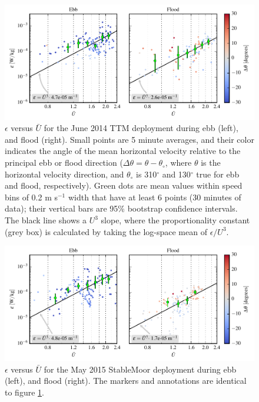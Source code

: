 \documentclass[twocol]{ametsoc}
\begin{document}
\begin{figure}[t]
  \centering
  \includegraphics{EpsVU_TTM_02}
  \caption{$\epsilon$ versus $\bar{U}$ for the June 2014 TTM deployment during ebb (left), and flood (right). Small points are 5 minute averages, and their color indicates the angle of the mean horizontal velocity relative to the principal ebb or flood direction ($\Delta\theta=\theta-\theta_\circ$, where $\theta$ is the horizontal velocity direction, and $\theta_\circ$ is 310$^\circ$ and 130$^\circ$ true for ebb and flood, respectively).  Green dots are mean values within speed bins of 0.2 m s$^{-1}$ width that have at least 6 points (30 minutes of data); their vertical bars are 95\% bootstrap confidence intervals. The black line shows a $U^3$ slope, where the proportionality constant (grey box) is calculated by taking the log-space mean of $\epsilon/U^3$. }
  \label{fig:epsVu:ttm}
\end{figure}

\begin{figure}[t]
  \centering
  \includegraphics{EpsVU_SM_02}
  \caption{$\epsilon$ versus $\bar{U}$ for the May 2015 StableMoor deployment during ebb (left), and flood (right). The markers and annotations are identical to figure \ref{fig:epsVu:ttm}. }
  \label{fig:epsVu:sm}
\end{figure}
\end{document}
